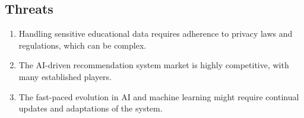 \subsection{Threats}
\begin{enumerate}
    \item Handling sensitive educational data requires adherence to privacy laws and regulations, which can be complex.
    \item The AI-driven recommendation system market is highly competitive, with many established players.
    \item The fast-paced evolution in AI and machine learning might require continual updates and adaptations of the system.
\end{enumerate}
